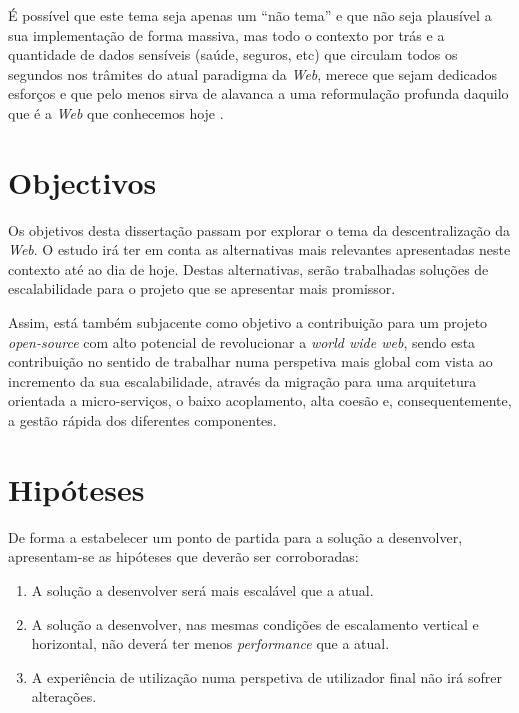 É possível que este tema seja apenas um “não tema” e que não seja plausível a sua implementação de forma massiva, mas todo o contexto por trás e a quantidade de dados sensíveis (saúde, seguros, etc) que circulam todos os segundos nos trâmites do atual paradigma da \emph{Web},
merece que sejam dedicados esforços e que pelo menos sirva de alavanca a uma reformulação profunda daquilo que é a \emph{Web} que conhecemos hoje \cite{why_web_decentralization_future}.

\section{Objectivos \label{objetivos}}
Os objetivos desta dissertação passam por explorar o tema da descentralização da \emph{Web}. O estudo irá ter em conta as alternativas mais relevantes apresentadas neste contexto até ao dia de hoje. Destas alternativas, serão trabalhadas soluções de escalabilidade para o projeto que se apresentar mais promissor.

Assim, está também subjacente como objetivo a contribuição para um projeto \emph{open-source} com alto potencial de revolucionar a \emph{world wide web}, sendo esta contribuição no sentido de trabalhar numa perspetiva mais global com vista ao incremento da sua escalabilidade, através da migração para uma arquitetura orientada a micro-serviços, o baixo acoplamento, alta coesão e, consequentemente, a gestão rápida dos diferentes componentes.

\section{Hipóteses \label{section_hypothesis}}
De forma a estabelecer um ponto de partida para a solução a desenvolver, apresentam-se as hipóteses que deverão ser corroboradas:
\begin{enumerate}
    \item A solução a desenvolver será mais escalável que a atual.
    \item A solução a desenvolver, nas mesmas condições de escalamento vertical e horizontal, não deverá ter menos \emph{performance} que a atual.
    \item A experiência de utilização numa perspetiva de utilizador final não irá sofrer alterações.
\end{enumerate}


